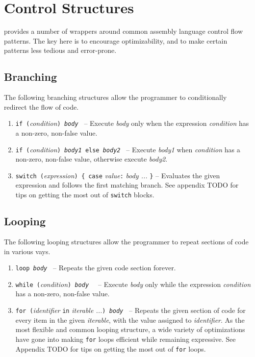 \section{Control Structures}

\gx{} provides a number of wrappers around common assembly language
control flow patterns. The key here is to encourage optimizability,
and to make certain patterns less tedious and error-prone.

\subsection{Branching}

The following branching structures allow the programmer to conditionally
redirect the flow of code.

\begin{enumerate}

\item {\tt if (}{\em condition}{\tt ) \string{} {\em body} {\tt \string}}
-- Execute {\em body} only when the expression {\em condition} has a
non-zero, non-false value.

\item {\tt if (}{\em condition}{\tt ) \string{} {\em body1} {\tt \string}
else \string{} {\em body2} {\tt \string}} -- Execute {\em body1} when {\em
condition} has a non-zero, non-false value, otherwise execute {\em body2}.

\item {\tt switch (}{\em expression}{\tt ) \{ case} {\em value}{\tt :}
{\em body ...} {\tt \}} -- Evaluates the given expression and follows
the first matching branch. See appendix TODO for tips on getting the
most out of {\tt switch} blocks.

\end{enumerate}

\subsection{Looping}

The following looping structures allow the programmer to repeat sections
of code in various vays.

\begin{enumerate}

\item {\tt loop \string{} {\em body} {\tt \string}} -- Repeats the given
code section forever.

\item {\tt while (}{\em condition}{\tt ) \string{} {\em body} {\tt
\string}} -- Execute {\em body} only while the expression {\em condition}
has a non-zero, non-false value.

\item {\tt for (}{\em identifier} {\tt in} {\em iterable ...}{\tt )
\string{} {\em body} {\tt \string}} -- Repeats the given section of code
for every item in the given {\em iterable}, with the value assigned to
{\em identifier}.  As the most flexible and common looping structure,
a wide variety of optimizations have gone into making {\tt for} loops
efficient while remaining expressive. See Appendix TODO for tips on
getting the most out of {\tt for} loops.

\end{enumerate}
